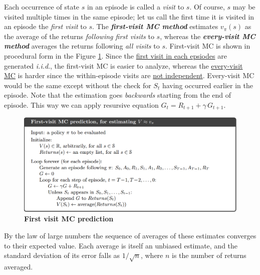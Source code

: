 \documentclass[11pt]{article}
\begin{document}
Each occurrence of state $s$ in an episode is called a \emph{visit} to $s$. Of course, $s$ may be visited multiple times in the same episode; let us call the first time it is visited in an episode the \emph{first visit} to $s$. The \emph{\textbf{first-visit MC method}} estimates $v_{\pi}(s)$ as the average of the returns \emph{following first visits} to $s$, whereas the \emph{\textbf{every-visit MC method}} averages the returns following \emph{all visits} to $s$. First-visit MC is shown in procedural form in the Figure \ref{fig: First_visit_MC_pred}. Since the \underline{first visit in each epsiodes} are generated \emph{i.i.d}.,  the first-visit MC is easier to analyze, whereas the \underline{every-visit MC} is harder since the within-episode visits are \underline{not independent}.  Every-visit MC would be the same except without the check for $S_t$ having occurred earlier in the episode. Note that the estimation goes \emph{backwards} starting from the end of episode. This way we can apply resursive equation $G_{t} = R_{t+1}+ \gamma\,G_{t+1}$. 

\begin{figure}
\begin{minipage}[t]{1\linewidth}
  \centering
  \centerline{\includegraphics[scale = 0.3]{First_visit_MC_pred.png}}
\end{minipage}
\caption{\footnotesize{\textbf{First visit MC prediction}}}
\label{fig: First_visit_MC_pred}
\end{figure}

By the law of large numbers the sequence of averages of these estimates converges to their expected value. Each average is itself an unbiased estimate, and the standard deviation of its error falls as $1/\sqrt{n}$, where $n$ is the number of returns averaged. 
\end{document}
